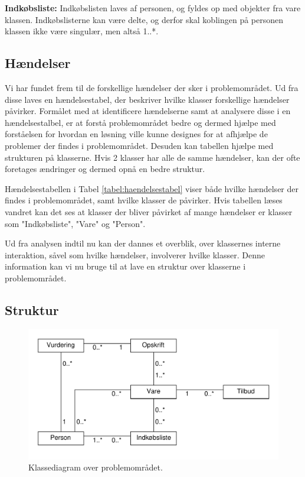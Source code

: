 \textbf{Indkøbsliste:}
Indkøbslisten laves af personen, og fyldes op med objekter fra vare klassen.
Indkøbslisterne kan være delte, og derfor skal koblingen på personen klassen ikke være singulær, men altså 1..*.


\subsection{Hændelser}
Vi har fundet frem til de forskellige hændelser der sker i problemområdet.
Ud fra disse laves en hændelsestabel, der beskriver hvilke klasser forskellige hændelser påvirker.
Formålet med at identificere hændelserne samt at analysere disse i en hændelsestalbel, er at forstå problemområdet bedre og dermed hjælpe med forståelsen for hvordan en løsning ville kunne designes for at afhjælpe de problemer der findes i problemområdet. Desuden kan tabellen hjælpe med strukturen på klasserne.
Hvis 2 klasser har alle de samme hændelser, kan der ofte foretages ændringer og dermed opnå en bedre struktur.



Hændelsestabellen i Tabel \ref{tabel:haendelsestabel} viser både hvilke hændelser der findes i problemområdet, samt hvilke klasser de påvirker.
Hvis tabellen læses vandret kan det ses at klasser der bliver påvirket af mange hændelser er klasser som "Indkøbsliste", "Vare" og "Person".

Ud fra analysen indtil nu kan der dannes et overblik, over klassernes interne interaktion, såvel som hvilke hændelser, involverer hvilke klasser.
Denne information kan vi nu bruge til at lave en struktur over klasserne i problemområdet.


\subsection{Struktur}\label{sec:struktur}

\begin{figure}
	\centering
		\includegraphics[scale=0.6]{images/Diagrams/klassediagram_model_simple.pdf}
	\caption{Klassediagram over problemområdet.}
	\label{figur:PDklasse}
\end{figure}

